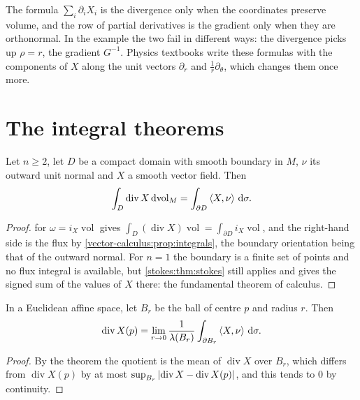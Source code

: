 \begin{notechapter}
\begin{pitfall}
The formula $\sum_i\partial_iX_i$ is the divergence only when the
coordinates preserve volume, and the row of partial derivatives is
the gradient only when they are orthonormal. In the example the two
fail in different ways: the divergence picks up $\rho = r$, the
gradient $G^{-1}$. Physics textbooks write these formulas with the
components of $X$ along the unit vectors $\partial_r$ and
$\frac1r\partial_\theta$, which changes them once more.
\end{pitfall}

\section{The integral theorems}\label{vector-calculus:sec:theorems}

\begin{theorem}\label{vector-calculus:thm:divergence}
Let $n\geq2$, let $D$ be a compact domain with smooth boundary in $M$,
$\nu$ its outward unit normal and $X$ a smooth vector field. Then
\[
  \int_D\operatorname{div}X\,\mathrm{d}\!\operatorname{vol}_M
  = \int_{\partial D}\left\langle X, \nu \right\rangle\,\mathrm{d}\sigma .
\]
\end{theorem}

\begin{proof}
 for $\omega = i_X\operatorname{vol}$ gives
$\int_D(\operatorname{div}X)\operatorname{vol}
= \int_{\partial D}i_X\operatorname{vol}$, and the right-hand side is
the flux by \cref{vector-calculus:prop:integrals}, the boundary
orientation being that of the outward normal. For $n = 1$ the boundary
is a finite set of points and no flux integral is available, but
\cref{stokes:thm:stokes} still applies and gives the signed sum of the
values of $X$ there: the fundamental theorem of calculus.
\end{proof}

\begin{corollary}\label{vector-calculus:cor:meaning}
In a Euclidean affine space, let $B_r$ be the ball of centre $p$ and
radius $r$. Then
\[
  \operatorname{div}X(p)
  = \lim_{r\to0}\frac1{\lambda(B_r)}
    \int_{\partial B_r}\left\langle X, \nu \right\rangle\,\mathrm{d}\sigma .
\]
\end{corollary}

\begin{proof}
By the theorem the quotient is the mean of $\operatorname{div}X$ over
$B_r$, which differs from $\operatorname{div}X(p)$ by at most
$\sup_{B_r}\left|\operatorname{div}X - \operatorname{div}X(p)\right|$, and
this tends to $0$ by continuity.
\end{proof}


\end{notechapter}
